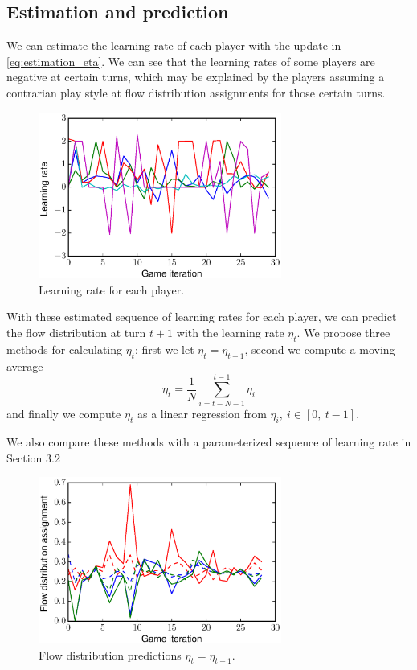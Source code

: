 \documentclass{sig-alternate-ipsn13}
\begin{document}
\subsection{Estimation and prediction}

We can estimate the learning rate of each player with the update in \ref{eq:estimation_eta}. We can see that the learning rates of some players are negative at certain turns, which may be explained by the players assuming a contrarian play style at flow distribution assignments for those certain turns.

\begin{figure}
  \centering
  \includegraphics[width=80mm]{images/learning_rate}
  \caption{Learning rate for each player.}
  \label{fig:learning_rates}
\end{figure}

With these estimated sequence of learning rates for each player, we can predict the flow distribution at turn $t+1$ with the learning rate $\eta_t$. We propose three methods for calculating $\eta_t$: first we let $\eta_t=\eta_{t-1}$, second we compute a moving average
\[
\eta_t=\dfrac{1}{N}\sum_{i=t-N-1}^{t-1}\eta_i
\] and finally we compute $\eta_t$ as a linear regression from $\eta_i,\ i \in [0,\ t-1]$.

We also compare these methods with a parameterized sequence of learning rate in Section 3.2

\begin{figure}
  \centering
  \includegraphics[width=80mm]{images/previous_eta_predictions}
  \caption{Flow distribution predictions $\eta_t = \eta_{t-1}$.}
  \label{fig:previous_eta_predictions}
\end{figure}
\end{document}
